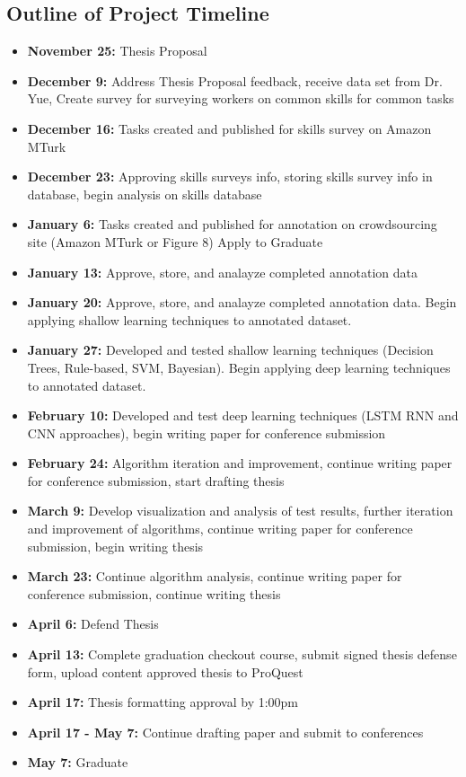 \documentclass[letterpaper,12pt]{article}
\begin{document}
\subsection{Outline of Project Timeline}
\begin{itemize}
	\item \textbf{November 25:} Thesis Proposal
	\item \textbf{December 9:} Address Thesis Proposal feedback, receive data set from Dr. Yue, Create survey for surveying workers on common skills for common tasks
	\item \textbf{December 16:} Tasks created and published for skills survey on Amazon MTurk
	\item \textbf{December 23:} Approving skills surveys info, storing skills survey info in database, begin analysis on skills database
	\item \textbf{January 6:} Tasks created and published for annotation on crowdsourcing site (Amazon MTurk or Figure 8) Apply to Graduate
	\item \textbf{January 13:} Approve, store, and analayze completed annotation data
	\item \textbf{January 20: } Approve, store, and analayze completed annotation data. Begin applying shallow learning techniques to annotated dataset.
	\item \textbf{January 27:} Developed and tested shallow learning techniques (Decision Trees, Rule-based, SVM, Bayesian). Begin applying deep learning techniques to annotated dataset.
	\item \textbf{February 10:} Developed and test deep learning techniques (LSTM RNN and CNN approaches), begin writing paper for conference submission
	\item \textbf{February 24:} Algorithm iteration and improvement, continue writing paper for conference submission, start drafting thesis
	\item \textbf{March 9:} Develop visualization and analysis of test results, further iteration and improvement of algorithms, continue writing paper for conference submission, begin writing thesis
	\item \textbf{March 23:} Continue algorithm analysis, continue writing paper for conference submission, continue writing thesis
	\item \textbf{April 6:} Defend Thesis
	\item \textbf{April 13:} Complete graduation checkout course, submit signed thesis defense form, upload content approved thesis to ProQuest
	\item \textbf{April 17:} Thesis formatting approval by 1:00pm
	\item \textbf{April 17 - May 7:} Continue drafting paper and submit to conferences
	\item \textbf{May 7:} Graduate
\end{itemize}
\end{document}

